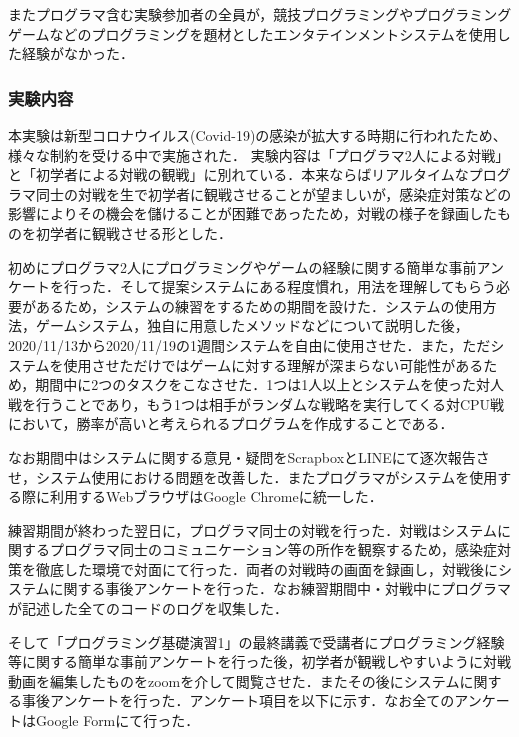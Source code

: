 またプログラマ含む実験参加者の全員が，競技プログラミングやプログラミングゲームなどのプログラミングを題材としたエンタテインメントシステムを使用した経験がなかった．

\subsubsection{実験内容}

本実験は新型コロナウイルス(Covid-19)の感染が拡大する時期に行われたため、様々な制約を受ける中で実施された．
実験内容は「プログラマ2人による対戦」と「初学者による対戦の観戦」に別れている．本来ならばリアルタイムなプログラマ同士の対戦を生で初学者に観戦させることが望ましいが，感染症対策などの影響によりその機会を儲けることが困難であったため，対戦の様子を録画したものを初学者に観戦させる形とした．

初めにプログラマ2人にプログラミングやゲームの経験に関する簡単な事前アンケートを行った．そして提案システムにある程度慣れ，用法を理解してもらう必要があるため，システムの練習をするための期間を設けた．システムの使用方法，ゲームシステム，独自に用意したメソッドなどについて説明した後，2020/11/13から2020/11/19の1週間システムを自由に使用させた．また，ただシステムを使用させただけではゲームに対する理解が深まらない可能性があるため，期間中に2つのタスクをこなさせた．1つは1人以上とシステムを使った対人戦を行うことであり，もう1つは相手がランダムな戦略を実行してくる対CPU戦において，勝率が高いと考えられるプログラムを作成することである．

なお期間中はシステムに関する意見・疑問をScrapboxとLINEにて逐次報告させ，システム使用における問題を改善した．またプログラマがシステムを使用する際に利用するWebブラウザはGoogle Chromeに統一した．

練習期間が終わった翌日に，プログラマ同士の対戦を行った．対戦はシステムに関するプログラマ同士のコミュニケーション等の所作を観察するため，感染症対策を徹底した環境で対面にて行った．両者の対戦時の画面を録画し，対戦後にシステムに関する事後アンケートを行った．なお練習期間中・対戦中にプログラマが記述した全てのコードのログを収集した．

そして「プログラミング基礎演習1」の最終講義で受講者にプログラミング経験等に関する簡単な事前アンケートを行った後，初学者が観戦しやすいように対戦動画を編集したものをzoomを介して閲覧させた．またその後にシステムに関する事後アンケートを行った．アンケート項目を以下に示す．なお全てのアンケートはGoogle Formにて行った．

